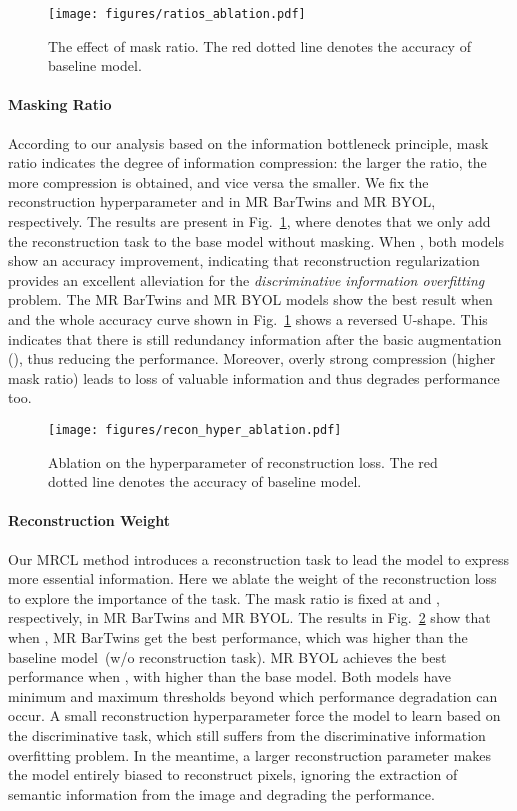 \documentclass[10pt,twocolumn,letterpaper]{article}
\begin{document}
\begin{figure}[h!]
    \centering
    \texttt{[image: figures/ratios\_ablation.pdf]}
    \caption{The effect of mask ratio. The red dotted line denotes the accuracy of baseline model.}
    \label{fig:ratio_abl}
\end{figure}
\paragraph{Masking Ratio} According to our analysis based on the information bottleneck principle, mask ratio indicates the degree of information compression: the larger the ratio, the more compression is obtained, and vice versa the smaller. We fix the reconstruction hyperparameter  and  in MR BarTwins and MR BYOL, respectively. The results are present in Fig.~\ref{fig:ratio_abl}, where  denotes that we only add the reconstruction task to the base model without masking. When , both models show an accuracy improvement, indicating that reconstruction regularization provides an excellent alleviation for the \textit{discriminative information overfitting} problem. The MR BarTwins and MR BYOL models show the best result when  and the whole accuracy curve shown in Fig.~\ref{fig:ratio_abl} shows a reversed U-shape. This indicates that there is still redundancy information after the basic augmentation (), thus reducing the performance. Moreover, overly strong compression (higher mask ratio) leads to loss of valuable information and thus degrades performance too. 

\begin{figure}[h!]
    \centering
    \texttt{[image: figures/recon\_hyper\_ablation.pdf]}
    \caption{Ablation on the hyperparameter of reconstruction loss. The red dotted line denotes the accuracy of baseline model.}
    \label{fig:abl2}
\end{figure}

\paragraph{Reconstruction Weight}
Our MRCL method introduces a reconstruction task to lead the model to express more essential information. Here we ablate the weight of the reconstruction loss to explore the importance of the task. The mask ratio is fixed at  and , respectively, in MR BarTwins and MR BYOL. The results in Fig.~\ref{fig:abl2} show that when , MR BarTwins get the best performance, which was  higher than the baseline model~(w/o reconstruction task). MR BYOL achieves the best performance when , with  higher than the base model. Both models have minimum and maximum thresholds beyond which performance degradation can occur. A small reconstruction hyperparameter force the model to learn based on the discriminative task, which still suffers from the discriminative information overfitting problem. In the meantime, a larger reconstruction parameter makes the model entirely biased to reconstruct pixels, ignoring the extraction of semantic information from the image and degrading the performance.
\end{document}
